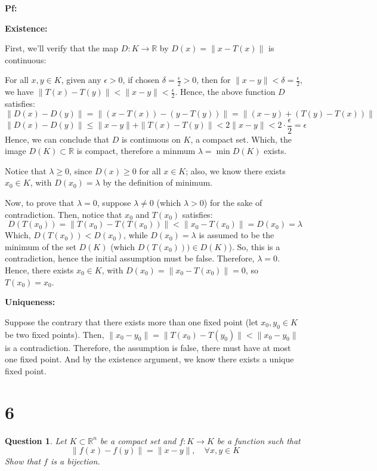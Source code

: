 \documentclass{article}
\newtheorem{question}{Question}
\begin{document}
\textbf{Pf:}

\textbf{Existence:}

First, we'll verify that the map $D:K\rightarrow\mathbb{R}$ by $D(x)=\|x-T(x)\|$ is continuous:

For all $x,y\in K$, given any $\epsilon>0$, if chosen $\delta=\frac{\epsilon}{2}>0$, then for $\|x-y\|<\delta=\frac{\epsilon}{2}$, we have $\|T(x)-T(y)\|<\|x-y\|<\frac{\epsilon}{2}$.
Hence, the above function $D$ satisfies:
$$\|D(x)-D(y)\|=\|(x-T(x))-(y-T(y))\| = \|(x-y)+(T(y)-T(x))\|$$
$$\|D(x)-D(y)\| \leq \|x-y\| + \|T(x)-T(y)\| < 2\|x-y\| < 2\cdot\frac{\epsilon}{2}=\epsilon$$
Hence, we can conclude that $D$ is continuous on $K$, a compact set. Which, the image $D(K)\subset \mathbb{R}$ is compact, therefore a minmum $\lambda=\min D(K)$ exists.

Notice that $\lambda \geq 0$, since $D(x)\geq 0$ for all $x\in K$; also, we know there exists $x_0\in K$, with $D(x_0)=\lambda$ by the definition of minimum.

Now, to prove that $\lambda=0$, suppose $\lambda \neq 0$ (which $\lambda>0$) for the sake of contradiction. Then, notice that $x_0$ and $T(x_0)$ satisfies:
$$D(T(x_0))=\|T(x_0)-T(T(x_0))\|<\|x_0-T(x_0)\| = D(x_0)=\lambda$$
Which, $D(T(x_0))<D(x_0)$, while $D(x_0)=\lambda$ is assumed to be the minimum of the set $D(K)$ (which $D(T(x_0)))\in D(K)$). So, this is a contradiction,
hence the initial assumption must be false. Therefore, $\lambda=0$. Hence, there exists $x_0\in K$, with $D(x_0)=\|x_0-T(x_0)\|=0$, so $T(x_0)=x_0$.

\hfil

\textbf{Uniqueness:}

Suppose the contrary that there exists more than one fixed point (let $x_0,y_0\in K$ be two fixed points). Then, $\|x_0-y_0\|=\|T(x_0)-T(y_0)\|<\|x_0-y_0\|$ is a contradiction.
Therefore, the assumption is false, there must have at most one fixed point. And by the existence argument, we know there exists a unique fixed point.

\hfil

\hfil

\section*{6}
\begin{myBox}[]{}
    \begin{question}
        Let $K\subset \mathbb{R}^n$
        be a compact set and $f : K \rightarrow K$ be a function such that
        $$\|f(x)-f(y)\|=\|x-y\|,\quad \forall x,y\in K$$
        Show that $f$ is a bijection.
    \end{question}
\end{myBox}
\end{document}
